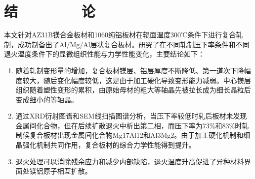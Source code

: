 \section*{结\ \ \ \ \ \ \ \ 论}


本文针对AZ31B镁合金板材和1060纯铝板材在辊面温度300℃条件下进行复合轧制，成功制备出了Al/Mg/Al层状复合板材。研究了在不同轧制压下率条件和不同退火温度条件下的显微组织性能与力学性能变化，主要结论如下：\par
\begin{enumerate}
    \item 随着轧制变形量的增加，复合板材镁层、铝层厚度不断降低、第一道次下降幅度较大，随后变化幅度较低，这是由于加工硬化导致变形能力减弱。中心镁层组织随着塑性变形的累积，由原始母材的粗大等轴晶先被拉长成为细长晶粒后变成细小的等轴晶。

    \item 通过XRD衍射图谱和SEM线扫描图谱分析，当压下率较低时轧后板材未发现金属间化合物，但在后续扩散退火中析出第二相，而压下率为73$\%$和83$\%$时轧制候复合板材出现金属间化合物Mg17Al12和Al3Mg2。由于加工硬化机制和细晶强化机制共同作用，复合板材的综合力学性能得到提升。

    \item 退火处理可以消除残余应力和减少内部缺陷，退火温度升高促进了异种材料界面处镁铝原子相互扩散。

\end{enumerate}

